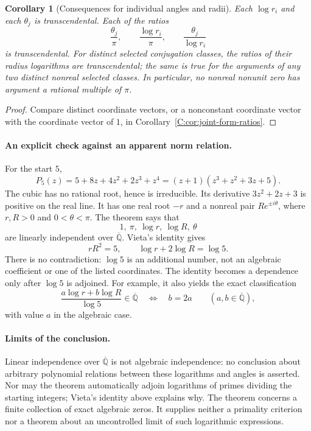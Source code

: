 \documentclass[11pt,a4paper]{article}
\newtheorem{corollary}[theorem]{Corollary}
\theoremstyle{definition}
\theoremstyle{remark}
\numberwithin{equation}{section}
\begin{document}
\begin{corollary}[Consequences for individual angles and radii]
\label{C:cor:joint-individual-ratios}
Each $\log r_i$ and each $\theta_j$ is transcendental.
Each of the ratios
\[
 \frac{\theta_j}{\pi},\qquad
 \frac{\log r_i}{\pi},\qquad
 \frac{\theta_j}{\log r_i}
\]
is transcendental.
For distinct selected conjugation classes, the ratios of their
radius logarithms are transcendental; the same is true for the
arguments of any two distinct nonreal selected classes.
In particular, no nonreal nonunit zero has argument a rational
multiple of $\pi$.
\end{corollary}

\begin{proof}
Compare distinct coordinate vectors, or a nonconstant coordinate
vector with the coordinate vector of $1$, in
Corollary~\ref{C:cor:joint-form-ratios}.
\end{proof}

\paragraph{An explicit check against an apparent norm relation.}
For the start $5$,
\[
 P_5(z)=5+8z+4z^2+2z^3+z^4
       =(z+1)(z^3+z^2+3z+5).
\]
The cubic has no rational root, hence is irreducible.
Its derivative $3z^2+2z+3$ is positive on the real line.
It has one real root $-r$ and a nonreal pair
$R e^{\pm i\theta}$, where $r,R>0$ and $0<\theta<\pi$.
The theorem says that
\[
 1,\ \pi,\ \log r,\ \log R,\ \theta
\]
are linearly independent over $\overline{\mathbb Q}$.
Vieta's identity gives
\[
 rR^2=5,\qquad \log r+2\log R=\log5.
\]
There is no contradiction: $\log5$ is an additional number, not
an algebraic coefficient or one of the listed coordinates.
The identity becomes a dependence only after $\log5$ is adjoined.
For example, it also yields the exact classification
\[
 \frac{a\log r+b\log R}{\log5}
 \in\overline{\mathbb Q}
 \quad\Longleftrightarrow\quad b=2a
 \qquad(a,b\in\overline{\mathbb Q}),
\]
with value $a$ in the algebraic case.

\paragraph{Limits of the conclusion.}
Linear independence over $\overline{\mathbb Q}$ is not algebraic
independence: no conclusion about arbitrary polynomial relations
between these logarithms and angles is asserted.
Nor may the theorem automatically adjoin logarithms of primes
dividing the starting integers; Vieta's identity above explains why.
The theorem concerns a finite collection of exact algebraic zeros.
It supplies neither a primality criterion nor a theorem about an
uncontrolled limit of such logarithmic expressions.
\end{document}
